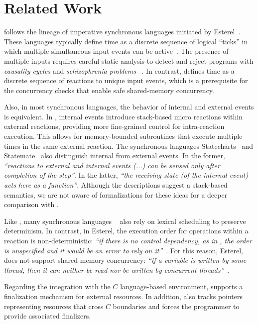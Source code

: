 \section{Related Work}

\CEU follows the lineage of imperative synchronous languages initiated by
Esterel~\cite{esterel.ieee91}.
These languages typically define time as a discrete sequence of logical
``ticks'' in which multiple simultaneous input events can be
active~\cite{ceu.tecs17}.
%
The presence of multiple inputs requires careful static analysis to detect and
reject programs with \emph{causality cycles} and \emph{schizophrenia problems}%
~\cite{esterel.constructive}.
%
In contrast, \CEU defines time as a discrete sequence of reactions to
unique input events, which is a prerequisite for the concurrency checks that
enable safe shared-memory concurrency.

Also, in most synchronous languages, the behavior of internal and external
events is equivalent.
In \CEU, internal events introduce stack-based micro reactions within external
reactions, providing more fine-grained control for intra-reaction execution.
%
This allows for memory-bounded subroutines that execute multiple times in the
same external reaction.
%
The synchronous languages Statecharts~\cite{statecharts.variants} and
Statemate~\cite{statecharts.statemate} also distinguish internal from external
events.
In the former, \emph{``reactions to external and internal events (...) can be
sensed only after completion of the step''}.
In the latter, \emph{``the receiving state (of the internal event) acts here as
a function''}.
Although the descriptions suggest a stack-based semantics, we are not aware of
formalizations for these ideas for a deeper comparison with \CEU.

Like \CEU, many synchronous languages%
~\cite{rp.rc,wsn.protothreads,wsn.sol,rp.synchc,rp.pretc}
also rely on lexical scheduling to preserve determinism.
%
In contrast, in Esterel, the execution order for operations within a reaction
is non-deterministic: \emph{``if there is no control dependency, as in
,
the order is unspecified and it would be an error to rely on
it''}~\cite{esterel.primer}.
%
For this reason, Esterel, does not support shared-memory concurrency:
\emph{``if a variable is written by some thread, then it can neither be read
nor be written by concurrent threads''}~\cite{esterel.primer}.

Regarding the integration with the $C$ language-based environment, \CEU
supports a finalization mechanism for external resources.
%
In addition, \CEU also tracks pointers representing resources that cross $C$
boundaries and forces the programmer to provide associated finalizers.
